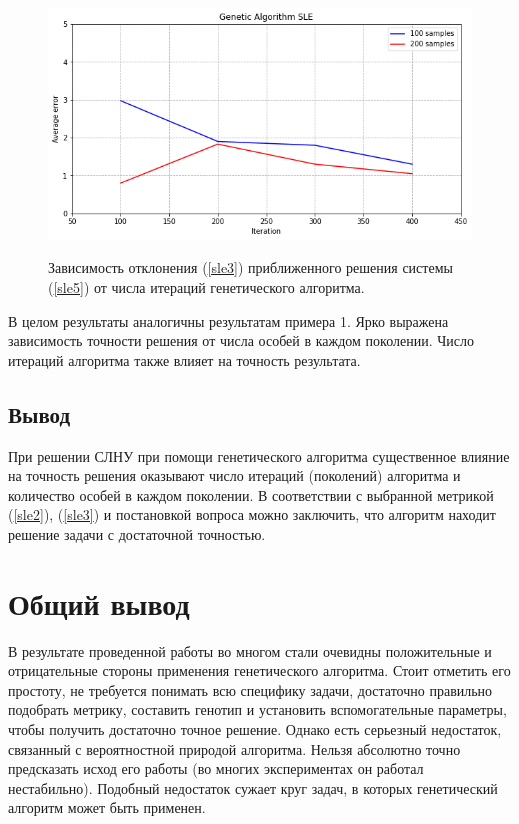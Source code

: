\documentclass[12pt, a4paper]{article}
\begin{document}
    \begin{figure}[h!]
        \center
        \includegraphics[width = 13cm]{sle2_3.png}
        \label{image421}
        \caption{Зависимость отклонения (\ref{sle3}) приближенного решения  
            системы (\ref{sle5}) от числа итераций генетического алгоритма.}
    \end{figure}
    
    В целом результаты аналогичны результатам примера 1. Ярко выражена 
    зависимость точности решения от числа особей в каждом поколении. Число 
    итераций алгоритма также влияет на точность результата.
    
    \subsection{Вывод}
    
    При решении СЛНУ при помощи генетического алгоритма существенное влияние 
    на точность решения оказывают число итераций (поколений) алгоритма и 
    количество особей в каждом поколении. В соответствии с выбранной 
    метрикой (\ref{sle2}), (\ref{sle3}) и постановкой вопроса можно 
    заключить, что алгоритм находит решение задачи с достаточной точностью. 
    
    \section{Общий вывод}
    
    В результате проведенной работы во многом стали очевидны положительные и 
    отрицательные стороны применения генетического алгоритма. Стоит отметить 
    его простоту, не требуется понимать всю специфику задачи, достаточно 
    правильно подобрать метрику, составить генотип и установить 
    вспомогательные параметры, чтобы получить достаточно точное решение. 
    Однако есть серьезный недостаток, связанный с вероятностной природой 
    алгоритма. Нельзя абсолютно точно предсказать исход его работы (во 
    многих экспериментах он работал нестабильно). Подобный недостаток сужает 
    круг задач, в которых генетический алгоритм может быть применен.
    
\end{document}
